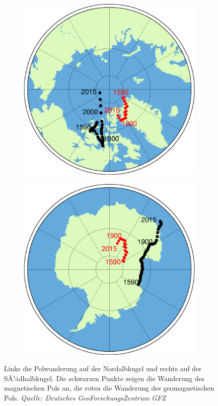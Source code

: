 \begin{figure}[H]
	\begin{subfigure}[m]{0.5\textwidth}
	\centering
		\includegraphics[scale = 0.7]{MagnetikBilder/PowanderungNordpol}	
	\end{subfigure}
	\begin{subfigure}[m]{0.5\textwidth}
	\centering
		\includegraphics[scale = 0.7]{MagnetikBilder/PolwanderungSuedpol}
	\end{subfigure}
	
	\caption*{Links die Polwanderung auf der Nordalbkugel und rechts auf der SÃ¼dhalbkugel. Die schwarzen Punkte zeigen die Wanderung des magnetischen Pols an, die roten die Wanderung des geomagnetischen Pols. \textsl{Quelle: Deutsches GeoForschungsZentrum GFZ}}
\end{figure}


